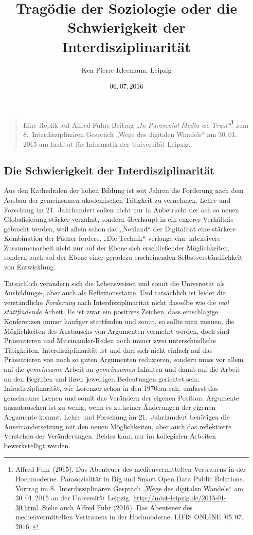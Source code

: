 \documentclass[12pt,a4paper]{article}
\title{Tragödie der Soziologie oder die Schwierigkeit der Interdisziplinarität}
\author{Ken Pierre Kleemann, Leipzig}
\date{06.\,07.\,2016}
\begin{document}
\maketitle

\begin{quote}
  Eine Replik auf Alfred Fuhrs Beitrag \emph{„In Parasocial Media we
    Trust“}\footnote{Alfred Fuhr (2015). Das Abenteuer des medienvermittelten
    Vertrauens in der Hochmoderne. Parasozialität in Big und Smart Open Data
    Public Relations.  Vortrag im 8.~Interdisziplinären Gespräch „Wege des
    digitalen Wandels“ am 30.\,01.\,2015 an der Universität Leipzig.
    \url{http://mint-leipzig.de/2015-01-30.html}. Siehe auch Alfred Fuhr
    (2016). Das Abenteuer des medienvermittelten Vertrauens in der
    Hochmoderne. LIFIS ONLINE [05.\,07.\,2016].}  zum 8.~Interdisziplinären
  Gespräch „Wege des digitalen Wandels“ am 30.\,01.\,2015 am Institut für
  Informatik der Universität Leipzig.
\end{quote}

\subsection*{Die Schwierigkeit der Interdisziplinarität}

Aus den Kathedralen der hohen Bildung ist seit Jahren die Forderung nach dem
Ausbau der gemeinsamen akademischen Tätigkeit zu vernehmen. Lehre und Forschung
im 21.~Jahrhundert sollen nicht nur in Anbetracht der ach so neuen
Globalisierung stärker verzahnt, sondern überhaupt in ein engeres Verhältnis
gebracht werden, weil allein schon das „Neuland“ der Digitalität eine stärkere
Kombination der Fächer fordere. „Die Technik“ verlange eine intensivere
Zusammenarbeit nicht nur auf der Ebene sich erschließender Möglichkeiten,
sondern auch auf der Ebene einer geradezu erscheinenden Selbstverständlichkeit
von Entwicklung.

Tatsächlich verändern sich die Lebensweisen und somit die Universität als
Ausbildungs-, aber auch als Reflexionsstätte. Und tatsächlich ist leider die
verständliche \emph{Forderung} nach Interdisziplinarität nicht dasselbe wie die
\emph{real stattfindende} Arbeit. Es ist zwar ein positives Zeichen, dass
einschlägige Konferenzen immer häufiger stattfinden und somit, so sollte man
meinen, die Möglichkeiten des Austauschs von Argumenten vermehrt werden, doch
sind Präsentieren und Miteinander-Reden noch immer zwei unterschiedliche
Tätigkeiten. Interdisziplinarität ist und darf sich nicht einfach auf das
Präsentieren von noch so guten Argumenten reduzieren, sondern muss vor allem
auf die \emph{gemeinsame} Arbeit an \emph{gemeinsamen} Inhalten und damit auf
die Arbeit an den Begriffen und ihren jeweiligen Bedeutungen gerichtet sein.
Infradisziplinarität, wie Lorenzer schon in den 1970ern sah, umfasst das
gemeinsame Lernen und somit das Verändern der eigenen Position. Argumente
auszutauschen ist zu wenig, wenn es zu keiner Änderungen der eigenen Argumente
kommt. Lehre und Forschung im 21.~Jahrhundert benötigen die Auseinandersetzung
mit den neuen Möglichkeiten, aber auch das reflektierte Verstehen der
Veränderungen. Beides kann nur im kollegialen Arbeiten bewerkstelligt werden.
\end{document}
